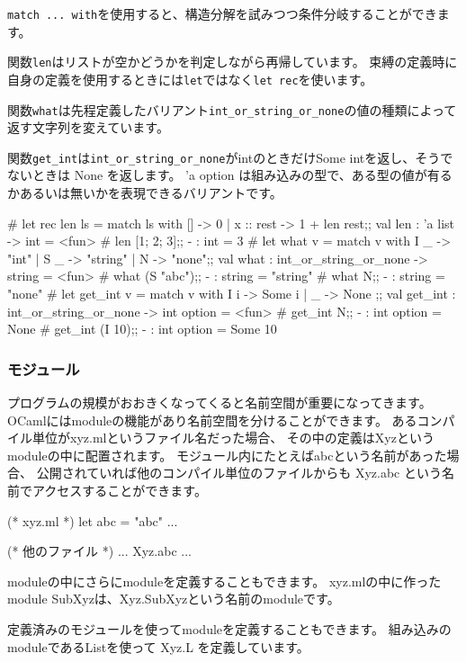 \documentclass[mingoth,a4paper]{jsarticle}
\begin{document}
\verb|match ... with|を使用すると、構造分解を試みつつ条件分岐することができます。

関数\verb|len|はリストが空かどうかを判定しながら再帰しています。
束縛の定義時に自身の定義を使用するときには\verb|let|ではなく\verb|let rec|を使います。

関数\verb|what|は先程定義したバリアント\verb|int_or_string_or_none|の値の種類によって返す文字列を変えています。

関数\verb|get_int|は\verb|int_or_string_or_none|がintのときだけSome intを返し、そうでないときは None を返します。
'a option は組み込みの型で、ある型の値が有るかあるいは無いかを表現できるバリアントです。

\begin{commandline}
# let rec len ls = match ls with [] -> 0 | x :: rest -> 1 + len rest;;
val len : 'a list -> int = <fun>
# len [1; 2; 3];;
- : int = 3
# let what v = match v with I _ -> "int" | S _ -> "string" | N -> "none";;
val what : int_or_string_or_none -> string = <fun>
# what (S "abc");;
- : string = "string"
# what N;;
- : string = "none"
# let get_int v = match v with I i -> Some i | _ -> None ;;
val get_int : int_or_string_or_none -> int option = <fun>
# get_int N;;
- : int option = None
# get_int (I 10);;
- : int option = Some 10
\end{commandline}

\subsubsection{モジュール}

プログラムの規模がおおきくなってくると名前空間が重要になってきます。
OCamlにはmoduleの機能があり名前空間を分けることができます。
あるコンパイル単位がxyz.mlというファイル名だった場合、
その中の定義はXyzというmoduleの中に配置されます。
モジュール内にたとえばabcという名前があった場合、
公開されていれば他のコンパイル単位のファイルからも Xyz.abc という名前でアクセスすることができます。

\begin{commandline}
(* xyz.ml *)
let abc = "abc"
...


(* 他のファイル *)
... Xyz.abc ...
\end{commandline}

moduleの中にさらにmoduleを定義することもできます。
xyz.mlの中に作ったmodule SubXyzは、Xyz.SubXyzという名前のmoduleです。

定義済みのモジュールを使ってmoduleを定義することもできます。
組み込みのmoduleであるListを使って Xyz.L を定義しています。
\end{document}
